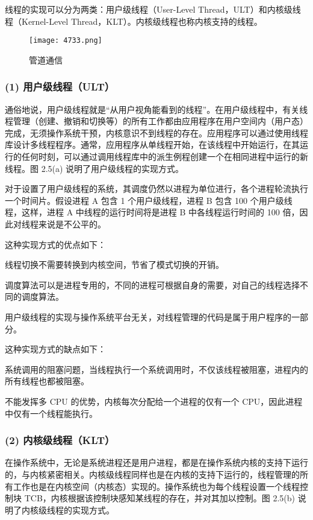 \documentclass{ctexbook}
\begin{document}
	线程的实现可以分为两类：用户级线程（User-Level Thread，ULT）和内核级线程（Kernel-Level Thread，KLT）。内核级线程也称内核支持的线程。
	
	\begin{figure}[h]
		\centering
		\texttt{[image: 4733.png]}
		\caption{管道通信}
		\label{fig:tttttt}
	\end{figure}
	
	\subsubsection{(1) 用户级线程（ULT）}
	
	通俗地说，用户级线程就是“从用户视角能看到的线程”。在用户级线程中，有关线程管理（创建、撤销和切换等）的所有工作都由应用程序在用户空间内（用户态）完成，无须操作系统干预，内核意识不到线程的存在。应用程序可以通过使用线程库设计多线程程序。通常，应用程序从单线程开始，在该线程中开始运行，在其运行的任何时刻，可以通过调用线程库中的派生例程创建一个在相同进程中运行的新线程。图 2.5(a) 说明了用户级线程的实现方式。
	
	对于设置了用户级线程的系统，其调度仍然以进程为单位进行，各个进程轮流执行一个时间片。假设进程 A 包含 1 个用户级线程，进程 B 包含 100 个用户级线程，这样，进程 A 中线程的运行时间将是进程 B 中各线程运行时间的 100 倍，因此对线程来说是不公平的。
	
	这种实现方式的优点如下：
	
线程切换不需要转换到内核空间，节省了模式切换的开销。

调度算法可以是进程专用的，不同的进程可根据自身的需要，对自己的线程选择不同的调度算法。

用户级线程的实现与操作系统平台无关，对线程管理的代码是属于用户程序的一部分。
	
	这种实现方式的缺点如下：
	
系统调用的阻塞问题，当线程执行一个系统调用时，不仅该线程被阻塞，进程内的所有线程也都被阻塞。

不能发挥多 CPU 的优势，内核每次分配给一个进程的仅有一个 CPU，因此进程中仅有一个线程能执行。
	
	\subsubsection{(2) 内核级线程（KLT）}
	
	在操作系统中，无论是系统进程还是用户进程，都是在操作系统内核的支持下运行的，与内核紧密相关。内核级线程同样也是在内核的支持下运行的，线程管理的所有工作也是在内核空间（内核态）实现的。操作系统也为每个线程设置一个线程控制块 TCB，内核根据该控制块感知某线程的存在，并对其加以控制。图 2.5(b) 说明了内核级线程的实现方式。
	
\end{document}
